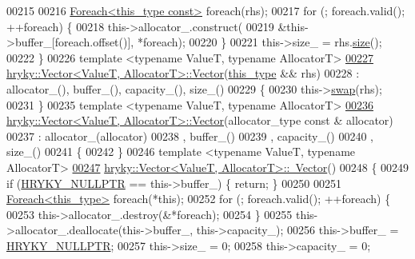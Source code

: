 \begin{DoxyCode}
00215 
00216     \hyperlink{classhryky_1_1_foreach}{Foreach<this_type const>} \textcolor{keywordflow}{foreach}(rhs);
00217     \textcolor{keywordflow}{for} (; \textcolor{keywordflow}{foreach}.valid(); ++\textcolor{keywordflow}{foreach}) \{
00218         this->allocator\_.construct(
00219             &this->buffer\_[\textcolor{keywordflow}{foreach}.offset()], *\textcolor{keywordflow}{foreach});
00220     \}
00221     this->size\_ = rhs.\hyperlink{classhryky_1_1_vector_a4bf9016a68dd7bf4967bf202b884a4fa}{size}();
00222 \}
00226 \textcolor{keyword}{template} <\textcolor{keyword}{typename} ValueT, \textcolor{keyword}{typename} AllocatorT>
\hypertarget{vector_8h_source_l00227}{}\hyperlink{classhryky_1_1_vector_ac10a64873fb488567b3a47d631129345}{00227} \hyperlink{classhryky_1_1_vector}{hryky::Vector<ValueT, AllocatorT>::Vector}(\hyperlink{classhryky_1_1_vector}{this_type} && rhs)
00228     : allocator\_(), buffer\_(), capacity\_(), size\_()
00229 \{
00230     this->\hyperlink{classhryky_1_1_vector_abcf365626457abf95d05b0a736e7a60a}{swap}(rhs);
00231 \}
00235 \textcolor{keyword}{template} <\textcolor{keyword}{typename} ValueT, \textcolor{keyword}{typename} AllocatorT>
\hypertarget{vector_8h_source_l00236}{}\hyperlink{classhryky_1_1_vector_a0ae18c032f267cdbadf0860df6000fdf}{00236} \hyperlink{classhryky_1_1_vector}{hryky::Vector<ValueT, AllocatorT>::Vector}(allocator\_type \textcolor{keyword}{const} & allocator)
00237     : allocator\_(allocator)
00238       , buffer\_()
00239       , capacity\_()
00240       , size\_()
00241 \{
00242 \}
00246 \textcolor{keyword}{template} <\textcolor{keyword}{typename} ValueT, \textcolor{keyword}{typename} AllocatorT>
\hypertarget{vector_8h_source_l00247}{}\hyperlink{classhryky_1_1_vector_a1d48f3026e8efefba8f1b441d71e1dca}{00247} \hyperlink{classhryky_1_1_vector}{hryky::Vector<ValueT, AllocatorT>::~Vector}()
00248 \{
00249     \textcolor{keywordflow}{if} (\hyperlink{common_8h_a4cd4ac09cfcdbd6b30ee69afc156e210}{HRYKY_NULLPTR} == this->buffer\_) \{ \textcolor{keywordflow}{return}; \}
00250 
00251     \hyperlink{classhryky_1_1_foreach}{Foreach<this_type>} \textcolor{keywordflow}{foreach}(*\textcolor{keyword}{this});
00252     \textcolor{keywordflow}{for} (; \textcolor{keywordflow}{foreach}.valid(); ++\textcolor{keywordflow}{foreach}) \{
00253         this->allocator\_.destroy(&*\textcolor{keywordflow}{foreach});
00254     \}
00255     this->allocator\_.deallocate(this->buffer\_, this->capacity\_);
00256     this->buffer\_ = \hyperlink{common_8h_a4cd4ac09cfcdbd6b30ee69afc156e210}{HRYKY_NULLPTR};
00257     this->size\_ = 0;
00258     this->capacity\_ = 0;

\end{DoxyCode}
